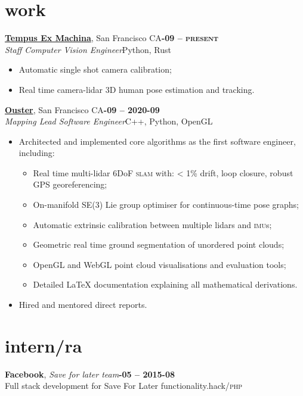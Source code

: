 \documentclass[margin,10pt]{res}
\begin{document}
\begin{resume}
\section{\sc \lsstyle work}
    \href{https://tempus-ex.com}{\textbf{Tempus Ex Machina}}, San Francisco CA\hfill \textsc{\bfseries{}-09 -- present}\\
    \textit{Staff Computer Vision Engineer}\hfill Python, Rust
    \vspace{0.5em}
    \begin{itemize}
        \item Automatic single shot camera calibration;
        \item Real time camera-lidar 3D human pose estimation and tracking.
    \end{itemize}

    \href{https://ouster.io}{\textbf{Ouster}}, San Francisco CA\hfill \textsc{\bfseries{}-09 -- 2020-09}\\
    \textit{Mapping Lead Software Engineer}\hfill C++, Python, OpenGL
    \vspace{0.5em}
    \begin{itemize}
        \item Architected and implemented core algorithms as the first software engineer, including:
        \begin{itemize}
            \item Real time multi-lidar 6DoF \textsc{slam} with: < 1\% drift, loop closure, robust GPS georeferencing;
            \item On-manifold SE(3) Lie group optimiser for continuous-time pose graphs;
            \item Automatic extrinsic calibration between multiple lidars and \textsc{imu}s;
            \item Geometric real time ground segmentation of unordered point clouds;
            \item OpenGL and WebGL point cloud visualisations and evaluation tools;
            \item Detailed LaTeX documentation explaining all mathematical derivations.
        \end{itemize}
        \item Hired and mentored direct reports.
    \end{itemize}
\section{\sc \lsstyle intern/ra}
    \textbf{Facebook}, \textit{Save for later team}\hfill \textsc{\bfseries{}-05 -- 2015-08}\\
    Full stack development for Save For Later functionality.\hfill hack/\textsc{php}


\end{resume}
\end{document}
